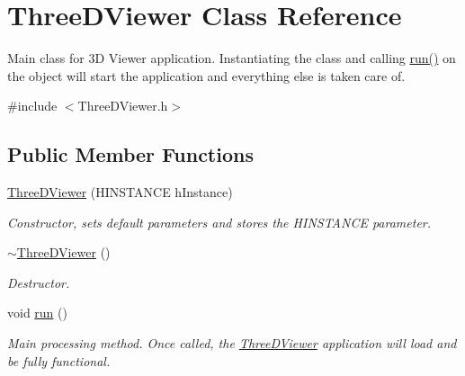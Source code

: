 \hypertarget{class_three_d_viewer}{
\section{ThreeDViewer Class Reference}
\label{class_three_d_viewer}
}


Main class for 3D Viewer application. Instantiating the class and calling \hyperlink{class_three_d_viewer_af0d2688c26f061516c739c4ebe5fdb62}{run()} on the object will start the application and everything else is taken care of.  




{\ttfamily \#include $<$ThreeDViewer.h$>$}

\subsection*{Public Member Functions}
\begin{DoxyCompactItemize}
\item 
\hyperlink{class_three_d_viewer_a92d7cedd73a319177f2823a698c2a56a}{ThreeDViewer} (HINSTANCE hInstance)
\begin{DoxyCompactList}\small\item\em Constructor, sets default parameters and stores the HINSTANCE parameter. \end{DoxyCompactList}\item 
\hypertarget{class_three_d_viewer_ad0c7e11bbb7b24cec5039fe1ed6d6e12}{
\hyperlink{class_three_d_viewer_ad0c7e11bbb7b24cec5039fe1ed6d6e12}{$\sim$ThreeDViewer} ()}
\label{class_three_d_viewer_ad0c7e11bbb7b24cec5039fe1ed6d6e12}

\begin{DoxyCompactList}\small\item\em Destructor. \end{DoxyCompactList}\item 
void \hyperlink{class_three_d_viewer_af0d2688c26f061516c739c4ebe5fdb62}{run} ()
\begin{DoxyCompactList}\small\item\em Main processing method. Once called, the \hyperlink{class_three_d_viewer}{ThreeDViewer} application will load and be fully functional. \end{DoxyCompactList}\end{DoxyCompactItemize}
